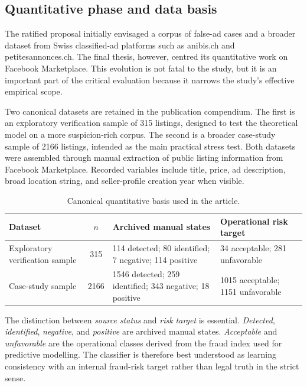 \documentclass[11pt,a4paper]{article}
\begin{document}
\subsection{Quantitative phase and data basis}
The ratified proposal initially envisaged a corpus of false-ad cases and a broader dataset from Swiss classified-ad platforms such as anibis.ch and petitesannonces.ch. The final thesis, however, centred its quantitative work on Facebook Marketplace. This evolution is not fatal to the study, but it is an important part of the critical evaluation because it narrows the study's effective empirical scope.

Two canonical datasets are retained in the publication compendium. The first is an exploratory verification sample of 315 listings, designed to test the theoretical model on a more suspicion-rich corpus. The second is a broader case-study sample of 2166 listings, intended as the main practical stress test. Both datasets were assembled through manual extraction of public listing information from Facebook Marketplace. Recorded variables include title, price, ad description, broad location string, and seller-profile creation year when visible.

\begin{table}[H]
\centering
\caption{Canonical quantitative basis used in the article.}
\begin{tabularx}{\textwidth}{p{3.4cm} c Y Y}
\toprule
\textbf{Dataset} & \textbf{$n$} & \textbf{Archived manual states} & \textbf{Operational risk target} \\
\midrule
Exploratory verification sample & 315 & 114 detected; 80 identified; 7 negative; 114 positive & 34 acceptable; 281 unfavorable \\
Case-study sample & 2166 & 1546 detected; 259 identified; 343 negative; 18 positive & 1015 acceptable; 1151 unfavorable \\
\bottomrule
\end{tabularx}
\end{table}

The distinction between \emph{source status} and \emph{risk target} is essential. \emph{Detected}, \emph{identified}, \emph{negative}, and \emph{positive} are archived manual states. \emph{Acceptable} and \emph{unfavorable} are the operational classes derived from the fraud index used for predictive modelling. The classifier is therefore best understood as learning consistency with an internal fraud-risk target rather than legal truth in the strict sense.
\end{document}
